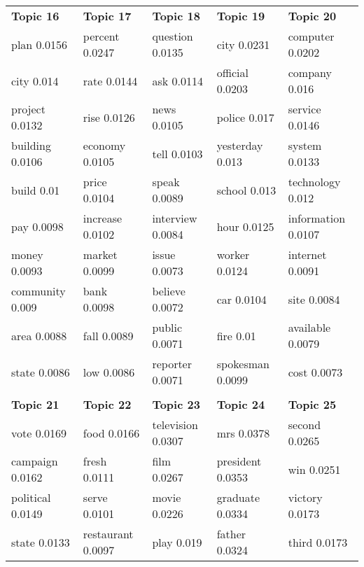 \documentclass[11pt]{report}
\begin{document}
\begin{table}[!hbt]
\begin{tabular}{| l | l | l |l|l|}
                                   &  &  &  &  \\
 \toprule \textbf{Topic 16} & \textbf{Topic 17} & \textbf{Topic 18} & \textbf{Topic 19} & \textbf{Topic 20} \\
                    \midrule plan 0.0156 & percent 0.0247 & question 0.0135 & city 0.0231 & computer 0.0202 \\
                                    city 0.014 & rate 0.0144 & ask 0.0114 & official 0.0203 & company 0.016 \\
                                 project 0.0132 & rise 0.0126 & news 0.0105 & police 0.017 & service 0.0146 \\
                           building 0.0106 & economy 0.0105 & tell 0.0103 & yesterday 0.013 & system 0.0133 \\
                                 build 0.01 & price 0.0104 & speak 0.0089 & school 0.013 & technology 0.012 \\
                         pay 0.0098 & increase 0.0102 & interview 0.0084 & hour 0.0125 & information 0.0107 \\
                              money 0.0093 & market 0.0099 & issue 0.0073 & worker 0.0124 & internet 0.0091 \\
                                  community 0.009 & bank 0.0098 & believe 0.0072 & car 0.0104 & site 0.0084 \\
                                   area 0.0088 & fall 0.0089 & public 0.0071 & fire 0.01 & available 0.0079 \\
                               state 0.0086 & low 0.0086 & reporter 0.0071 & spokesman 0.0099 & cost 0.0073 \\
                                                                                                &  &  &  &  \\
 \toprule \textbf{Topic 21} & \textbf{Topic 22} & \textbf{Topic 23} & \textbf{Topic 24} & \textbf{Topic 25} \\
                        \midrule vote 0.0169 & food 0.0166 & television 0.0307 & mrs 0.0378 & second 0.0265 \\
                               campaign 0.0162 & fresh 0.0111 & film 0.0267 & president 0.0353 & win 0.0251 \\
                          political 0.0149 & serve 0.0101 & movie 0.0226 & graduate 0.0334 & victory 0.0173 \\
                               state 0.0133 & restaurant 0.0097 & play 0.019 & father 0.0324 & third 0.0173 \\

\end{tabular}
\end{table}
\end{document}

